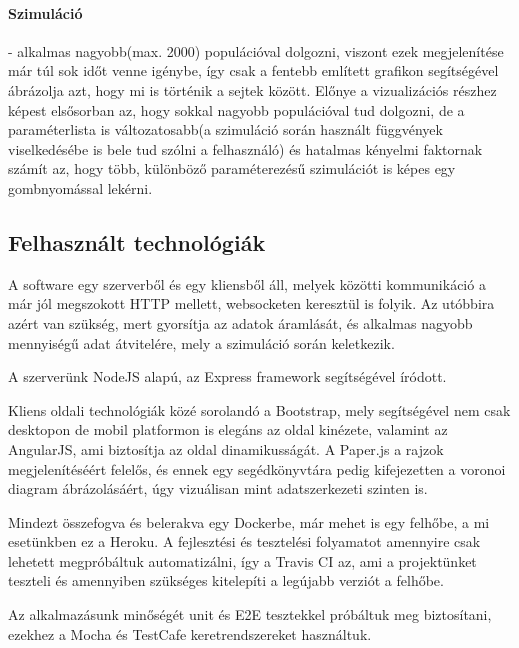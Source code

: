 \paragraph{Szimuláció}- alkalmas nagyobb(max. 2000) populációval dolgozni, viszont ezek megjelenítése már túl sok időt venne igénybe, így csak a fentebb említett grafikon segítségével ábrázolja azt, hogy mi is történik a sejtek között. Előnye a vizualizációs részhez képest elsősorban az, hogy sokkal nagyobb populációval tud dolgozni, de a paraméterlista is változatosabb(a szimuláció során használt függvények viselkedésébe is bele tud szólni a felhasználó) és hatalmas kényelmi faktornak számít az, hogy több, különböző paraméterezésű szimulációt is képes egy gombnyomással lekérni.

\subsection{Felhasznált technológiák}

A software egy szerverből és egy kliensből áll, melyek közötti kommunikáció a már jól megszokott HTTP mellett, websocketen keresztül is folyik. Az utóbbira azért van szükség, mert gyorsítja az adatok áramlását, és alkalmas nagyobb mennyiségű adat átvitelére, mely a szimuláció során keletkezik.

A szerverünk NodeJS alapú, az Express framework segítségével íródott.

Kliens oldali technológiák közé sorolandó a Bootstrap, mely segítségével nem csak desktopon de mobil platformon is elegáns az oldal kinézete, valamint az AngularJS, ami biztosítja az oldal dinamikusságát. A Paper.js a rajzok megjelenítéséért felelős, és ennek egy segédkönyvtára pedig kifejezetten a voronoi diagram ábrázolásáért, úgy vizuálisan mint adatszerkezeti szinten is. 

Mindezt összefogva és belerakva egy Dockerbe, már mehet is egy felhőbe, a mi esetünkben ez a Heroku. A fejlesztési és tesztelési folyamatot amennyire csak lehetett megpróbáltuk automatizálni, így a Travis CI az, ami a projektünket teszteli és amennyiben szükséges kitelepíti a legújabb verziót a felhőbe.

Az alkalmazásunk minőségét unit és E2E tesztekkel próbáltuk meg biztosítani, ezekhez a Mocha és TestCafe keretrendszereket használtuk. 
